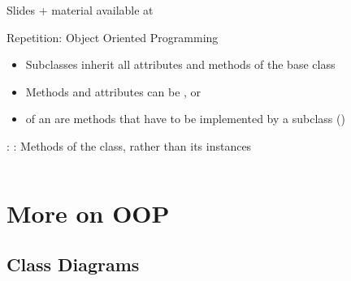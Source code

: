 \begin{frame}
	\tableofcontents[]
	Slides + material available at 
\end{frame}

\begin{frame}{Repetition: Object Oriented Programming}
	\begin{itemize}
		\item {} Subclasses inherit all  attributes and methods of the base class
		\item Methods and attributes can be  ,   or  
		\item {} of an  are methods that have to be implemented by a subclass ()
	\end{itemize}

	\bigskip
	: : Methods of the class, rather than its instances
	\inputminted[fontsize=\small]{python}{code/patterns/intro/classmethod.py}
\end{frame}


\section{More on OOP}

\subsection{Class Diagrams}

